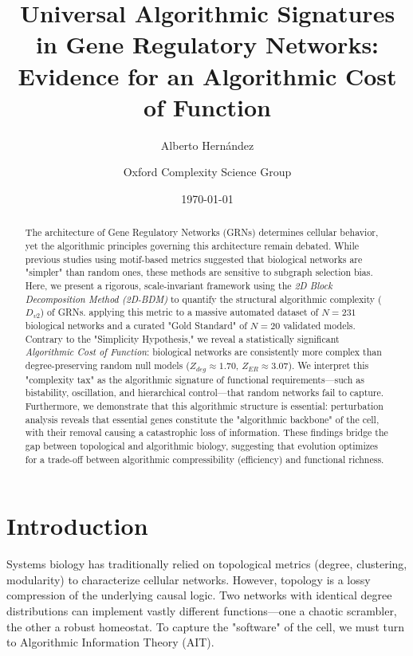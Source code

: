 \documentclass{article}
\title{Universal Algorithmic Signatures in Gene Regulatory Networks: \\ Evidence for an Algorithmic Cost of Function}
\author[1]{Alberto Hernández}
\author[1]{Oxford Complexity Science Group}
\affil[1]{Department of Computer Science, University of Oxford}
\date{\today}
\begin{document}
\maketitle

\begin{abstract}
The architecture of Gene Regulatory Networks (GRNs) determines cellular behavior, yet the algorithmic principles governing this architecture remain debated. While previous studies using motif-based metrics suggested that biological networks are "simpler" than random ones, these methods are sensitive to subgraph selection bias. Here, we present a rigorous, scale-invariant framework using the \textit{2D Block Decomposition Method (2D-BDM)} to quantify the structural algorithmic complexity ($D_{v2}$) of GRNs. applying this metric to a massive automated dataset of $N=231$ biological networks and a curated "Gold Standard" of $N=20$ validated models. Contrary to the "Simplicity Hypothesis," we reveal a statistically significant \textit{Algorithmic Cost of Function}: biological networks are consistently more complex than degree-preserving random null models ($Z_{deg} \approx 1.70$, $Z_{ER} \approx 3.07$). We interpret this "complexity tax" as the algorithmic signature of functional requirements—such as bistability, oscillation, and hierarchical control—that random networks fail to capture. Furthermore, we demonstrate that this algorithmic structure is essential: perturbation analysis reveals that essential genes constitute the "algorithmic backbone" of the cell, with their removal causing a catastrophic loss of information. These findings bridge the gap between topological and algorithmic biology, suggesting that evolution optimizes for a trade-off between algorithmic compressibility (efficiency) and functional richness.
\end{abstract}

\section{Introduction}

Systems biology has traditionally relied on topological metrics (degree, clustering, modularity) to characterize cellular networks. However, topology is a lossy compression of the underlying causal logic. Two networks with identical degree distributions can implement vastly different functions—one a chaotic scrambler, the other a robust homeostat. To capture the "software" of the cell, we must turn to Algorithmic Information Theory (AIT).
\end{document}
